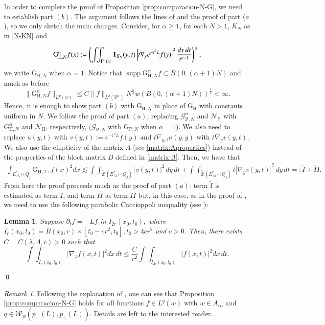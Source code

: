 \documentclass[11pt, a4paper,leqno]{amsart}
\renewcommand{\chi}{{\bf 1}}
\theoremstyle{plain}
\newtheorem{lemma}[equation]{Lemma}
\theoremstyle{definition}
\theoremstyle{remark}
\newtheorem{remark}[equation]{Remark}
\numberwithin{equation}{section}
\def \R{ \mathbb{R} }
\def \hh{ \mathrm{H} }
\def \pp{ \mathrm{P} }
\def \Gcal { \mathcal{G} }
\def \Grm{ \mathrm{G} }
\def \Ncal { \mathcal{N} }
\def \iint{\int\!\!\!\int}
\DeclareMathOperator{\supp}{supp}
\begin{document}
In order to complete the proof of Proposition \ref{prop:comparacion-N-G}, we need to establish part $(b)$. The argument follows the lines of \cite[Theorem 6.1]{HofmannMayboroda} and the proof of  part ($a$), so we only sketch the main changes.
Consider, for $\alpha\geq 1$, for each $N>1$, $K_N$ as in \eqref{N-KN} and
 $$
 \Grm_{\hh,N}^{\alpha}f(x):=\left(\iint_{\Gamma^{\alpha}(x)}\chi_{K_N}(y,t)\left|t\nabla_ye^{-t^2L}f(y)\right|^2\frac{dy \, dt}{t^{n+1}}\right)^{\frac{1}{2}},
 $$
 we write $\Grm_{\hh,N}$ when $\alpha=1$.
Notice that $\supp  \Grm_{\hh,N}^{\alpha}f\subset B(0,(\alpha+1)N)$ and much as before
$$
\|\Grm_{\hh,N}^{\alpha}f\|_{L^p(w)}\leq C \|f\|_{L^2(\R^n)}N^{\frac{n}{2}}w(B(0,(\alpha+1)N))^{\frac{1}{p}}<\infty.
$$
Hence,  it is enough to show part $(b)$ with $\Grm_{\hh,N}$ in place of $\Grm_{\hh}$
with constants uniform in $N$. 
We follow the proof of part $(a)$,
 replacing $\Gcal_{\pp,N}^{\alpha}$ and $\Ncal_{\pp}$ with $\Grm_{\hh,N}^{\alpha}$ and $\Ncal_{\hh}$, respectively, ($\Gcal_{\pp,N}$ with $\Grm_{\pp,N}$ when $\alpha=1$). We also need to replace  $u(y,t)$ with
 $v(y,t):=e^{-t^2L}f(y)$ and $t\nabla_{y,t}u(y,y)$ with $t\nabla_yv(y,t)$.
We also use the ellipticity of the matrix $A$ (see \eqref{matrix:Aproperties}) instead of the properties of the block matrix $B$ defined in \eqref{matrix:B}. Then, we have that 
\begin{align*}
\int_{E^*_{\gamma\lambda}\cap Q_j}\Grm_{\hh,2,\varepsilon}f(x)^2 dx
\lesssim  \iint_{\widetilde{\mathcal{B}}(E^*_{\gamma\lambda}\cap Q_j)}|v(y,t)|^2 \, dy \, dt+ \iint_{\widetilde{\mathcal{B}}(E^*_{\gamma\lambda}\cap Q_j)}t|\nabla_{y}v(y,t)|^2 \, dy \, dt
=:\widetilde{I}+\widetilde{II}.
\end{align*}
From here the proof proceeds much as the proof of part $(a)$: 
term $\widetilde{I}$ is estimated as term $I$, and term  $\widetilde{II}$ as term
${II}$ but, in this case, as in the proof of \cite[Theorem 6.1]{HofmannMayboroda}, we need to use the following parabolic Caccioppoli inequality (see \cite[Lemma 2.8]{HofmannMayboroda}):
\begin{lemma}
Suppose $\partial_tf=-Lf$ in $I_{2r}(x_0,t_0),$ where $I_r(x_0,t_0)=B(x_0,r)\times [t_0-cr^2,t_0], t_0>4cr^2$ and $c>0$. Then, there exists $C=C(\lambda,\Lambda,c)>0$ such that
$$
\iint_{I_r(x_0,t_0)}|\nabla_xf(x,t)|^2 dx \, dt\leq \frac{C}{r^2}\iint_{I_{2r}(x_0,t_0)}|f(x,t)|^2 dx \, dt.
$$
\end{lemma}
\qed



\begin{remark}\label{remark:classesoffunctions-N}
Following the explanation of \cite[Remark 4.22]{MartellPrisuelos}, one can see that  Proposition \ref{prop:comparacion-N-G} holds for all functions $f\in L^q(w)$ with $w\in A_\infty$ and $q\in \mathcal{W}_{w}(p_-(L), p_+(L))$. Details are left to the interested reader.
\end{remark}
\end{document}
